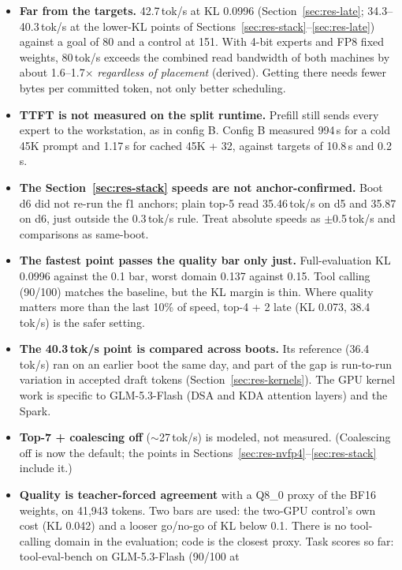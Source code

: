 \documentclass[11pt]{article}
\newcommand{\tps}{\,tok/s}
\begin{document}
\begin{itemize}
  \item \textbf{Far from the targets.} 42.7\tps{} at KL 0.0996 (Section~\ref{sec:res-late}; 34.3--40.3\tps{} at the
    lower-KL points of Sections~\ref{sec:res-stack}--\ref{sec:res-late}) against a goal of 80 and a control at 151.
    With 4-bit experts and FP8 fixed weights, 80\tps{} exceeds the combined read bandwidth of both machines by about
    1.6--1.7$\times$ \emph{regardless of placement} (derived). Getting there needs fewer bytes per committed token, not
    only better scheduling.
  \item \textbf{TTFT is not measured on the split runtime.} Prefill still sends every expert to the workstation, as in
    config B. Config B measured 994\,s for a cold 45K prompt and 1.17\,s for cached 45K + 32, against targets of 10.8\,s
    and 0.2\,s.
  \item \textbf{The Section~\ref{sec:res-stack} speeds are not anchor-confirmed.} Boot d6 did not re-run the f1 anchors;
    plain top-5 read 35.46\tps{} on d5 and 35.87 on d6, just outside the 0.3\tps{} rule. Treat absolute speeds as
    $\pm$0.5\tps{} and comparisons as same-boot.
  \item \textbf{The fastest point passes the quality bar only just.} Full-evaluation KL 0.0996 against the 0.1 bar,
    worst domain 0.137 against 0.15. Tool calling (90/100) matches the baseline, but the KL margin is thin. Where quality
    matters more than the last 10\% of speed, top-4 + 2 late (KL 0.073, 38.4\tps) is the safer setting.
  \item \textbf{The 40.3\tps{} point is compared across boots.} Its reference (36.4\tps) ran on an earlier boot the
    same day, and part of the gap is run-to-run variation in accepted draft tokens (Section~\ref{sec:res-kernels}). The
    GPU kernel work is specific to GLM-5.3-Flash (DSA and KDA attention layers) and the Spark.
  \item \textbf{Top-7 + coalescing off} ($\sim$27\tps) is modeled, not measured. (Coalescing off is now the default;
    the points in Sections~\ref{sec:res-nvfp4}--\ref{sec:res-stack} include it.)
  \item \textbf{Quality is teacher-forced agreement} with a Q8\_0 proxy of the BF16 weights, on 41,943 tokens. Two bars
    are used: the two-GPU control's own cost (KL 0.042) and a looser go/no-go of KL below 0.1. There is no tool-calling
    domain in the evaluation; code is the closest proxy. Task scores so far: tool-eval-bench on GLM-5.3-Flash (90/100 at

\end{itemize}
\end{document}
